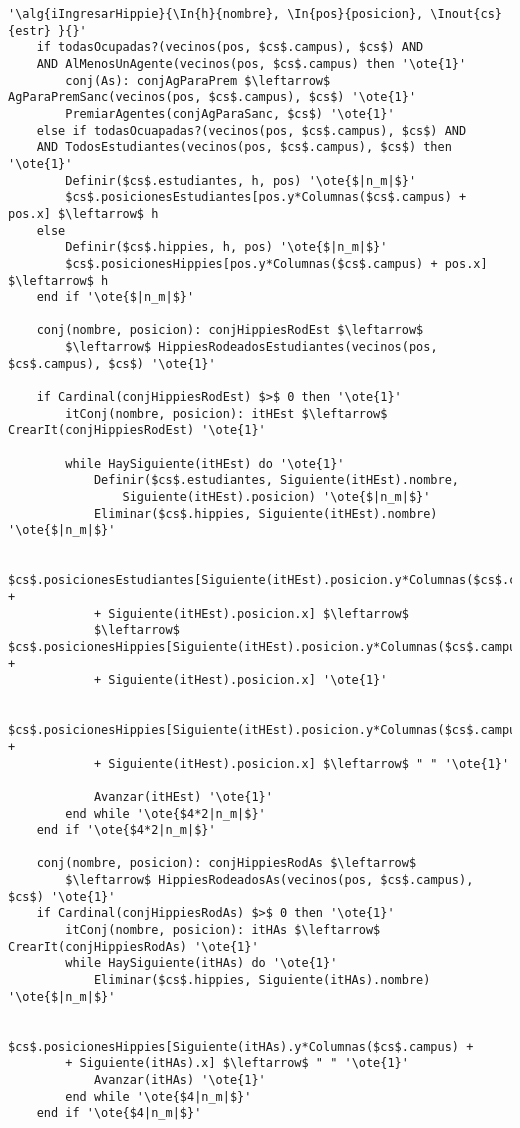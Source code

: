 \begin{lstlisting}[mathescape]
'\alg{iIngresarHippie}{\In{h}{nombre}, \In{pos}{posicion}, \Inout{cs}{estr} }{}'
	if todasOcupadas?(vecinos(pos, $cs$.campus), $cs$) AND
	AND AlMenosUnAgente(vecinos(pos, $cs$.campus) then '\ote{1}'
		conj(As): conjAgParaPrem $\leftarrow$ AgParaPremSanc(vecinos(pos, $cs$.campus), $cs$) '\ote{1}'
		PremiarAgentes(conjAgParaSanc, $cs$) '\ote{1}'
	else if todasOcuapadas?(vecinos(pos, $cs$.campus), $cs$) AND
	AND TodosEstudiantes(vecinos(pos, $cs$.campus), $cs$) then '\ote{1}'
		Definir($cs$.estudiantes, h, pos) '\ote{$|n_m|$}'
		$cs$.posicionesEstudiantes[pos.y*Columnas($cs$.campus) + pos.x] $\leftarrow$ h
	else
		Definir($cs$.hippies, h, pos) '\ote{$|n_m|$}'
		$cs$.posicionesHippies[pos.y*Columnas($cs$.campus) + pos.x] $\leftarrow$ h
	end if '\ote{$|n_m|$}'

	conj(nombre, posicion): conjHippiesRodEst $\leftarrow$
		$\leftarrow$ HippiesRodeadosEstudiantes(vecinos(pos, $cs$.campus), $cs$) '\ote{1}'

	if Cardinal(conjHippiesRodEst) $>$ 0 then '\ote{1}'
		itConj(nombre, posicion): itHEst $\leftarrow$ CrearIt(conjHippiesRodEst) '\ote{1}'

		while HaySiguiente(itHEst) do '\ote{1}'
			Definir($cs$.estudiantes, Siguiente(itHEst).nombre,
				Siguiente(itHEst).posicion) '\ote{$|n_m|$}'
			Eliminar($cs$.hippies, Siguiente(itHEst).nombre) '\ote{$|n_m|$}'

			$cs$.posicionesEstudiantes[Siguiente(itHEst).posicion.y*Columnas($cs$.campus) +
			+ Siguiente(itHEst).posicion.x] $\leftarrow$
			$\leftarrow$ $cs$.posicionesHippies[Siguiente(itHEst).posicion.y*Columnas($cs$.campus) +
			+ Siguiente(itHest).posicion.x] '\ote{1}'

			$cs$.posicionesHippies[Siguiente(itHEst).posicion.y*Columnas($cs$.campus) +
			+ Siguiente(itHest).posicion.x] $\leftarrow$ " " '\ote{1}'

			Avanzar(itHEst) '\ote{1}'
		end while '\ote{$4*2|n_m|$}'
	end if '\ote{$4*2|n_m|$}'

	conj(nombre, posicion): conjHippiesRodAs $\leftarrow$
		$\leftarrow$ HippiesRodeadosAs(vecinos(pos, $cs$.campus), $cs$) '\ote{1}'
	if Cardinal(conjHippiesRodAs) $>$ 0 then '\ote{1}'
		itConj(nombre, posicion): itHAs $\leftarrow$ CrearIt(conjHippiesRodAs) '\ote{1}'
		while HaySiguiente(itHAs) do '\ote{1}'
			Eliminar($cs$.hippies, Siguiente(itHAs).nombre) '\ote{$|n_m|$}'

			$cs$.posicionesHippies[Siguiente(itHAs).y*Columnas($cs$.campus) +
		+ Siguiente(itHAs).x] $\leftarrow$ " " '\ote{1}'
			Avanzar(itHAs) '\ote{1}'
		end while '\ote{$4|n_m|$}'
	end if '\ote{$4|n_m|$}'


\end{lstlisting}
